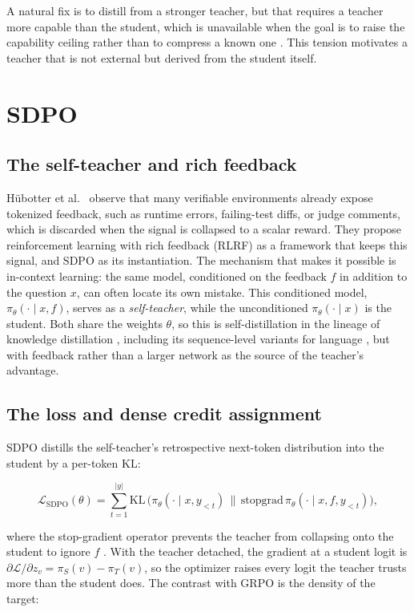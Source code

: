 A natural fix is to distill from a stronger teacher, but that requires a teacher more capable than the student, which is unavailable when the goal is to raise the capability ceiling rather than to compress a known one \cite{r1}. This tension motivates a teacher that is not external but derived from the student itself.

\section{SDPO}\label{sdpo}

\subsection{The self-teacher and rich feedback}\label{the-self-teacher-and-rich-feedback}

Hübotter et al.~\cite{r1} observe that many verifiable environments already expose tokenized feedback, such as runtime errors, failing-test diffs, or judge comments, which is discarded when the signal is collapsed to a scalar reward. They propose reinforcement learning with rich feedback (RLRF) as a framework that keeps this signal, and SDPO as its instantiation. The mechanism that makes it possible is in-context learning: the same model, conditioned on the feedback \(f\) in addition to the question \(x\), can often locate its own mistake. This conditioned model, \(\pi_\theta(\cdot \mid x, f)\), serves as a \emph{self-teacher}, while the unconditioned \(\pi_\theta(\cdot \mid x)\) is the student. Both share the weights \(\theta\), so this is self-distillation in the lineage of knowledge distillation \cite{r13}, including its sequence-level variants for language \cite{r24}, but with feedback rather than a larger network as the source of the teacher's advantage.

\subsection{The loss and dense credit assignment}\label{the-loss-and-dense-credit-assignment}

SDPO distills the self-teacher's retrospective next-token distribution into the student by a per-token KL:

\[
\mathcal{L}_{\text{SDPO}}(\theta) = \sum_{t=1}^{|y|} \mathrm{KL}\,\Big(\pi_\theta(\cdot \mid x, y_{<t}) \,\big\|\, \mathrm{stopgrad}\,\pi_\theta(\cdot \mid x, f, y_{<t})\Big),
\]

where the stop-gradient operator prevents the teacher from collapsing onto the student to ignore \(f\) \cite{r1}. With the teacher detached, the gradient at a student logit is \(\partial\mathcal{L}/\partial z_v = \pi_S(v) - \pi_T(v)\), so the optimizer raises every logit the teacher trusts more than the student does. The contrast with GRPO is the density of the target:

